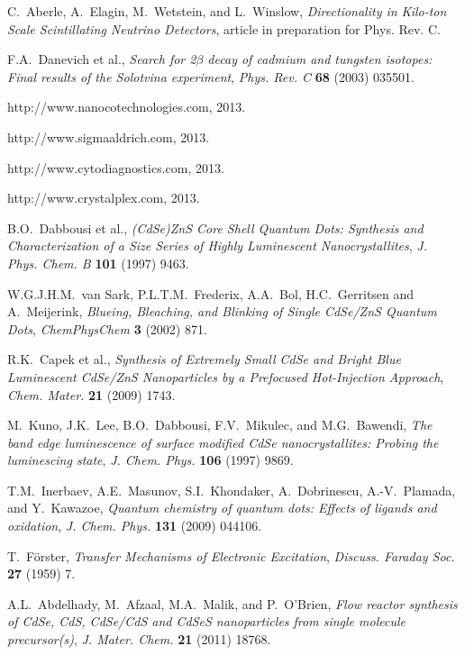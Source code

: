 \documentclass[cits]{JINST}
\begin{document}
\begin{thebibliography}{9}
C.~Aberle, A.~Elagin, M.~Wetstein, and L.~Winslow, \emph{Directionality in Kilo-ton Scale Scintillating Neutrino Detectors}, article in preparation for Phys. Rev. C. 
 
F.A.~Danevich et al., \emph{Search for 2$\beta$ decay of cadmium and tungsten isotopes: Final results of the Solotvina experiment}, \emph{Phys. Rev. C} {\bf 68} (2003) 035501.

http://www.nanocotechnologies.com, 2013. 

http://www.sigmaaldrich.com, 2013. 

http://www.cytodiagnostics.com, 2013.

http://www.crystalplex.com, 2013. 

B.O.~Dabbousi et al., \emph{(CdSe)ZnS Core Shell Quantum Dots: Synthesis and Characterization of a Size Series of Highly Luminescent Nanocrystallites}, \emph{J. Phys. Chem. B} {\bf 101} (1997) 9463.

W.G.J.H.M.~van Sark, P.L.T.M.~Frederix, A.A.~Bol, H.C.~Gerritsen and A.~Meijerink, \emph{Blueing, Bleaching, and Blinking of Single CdSe/ZnS Quantum Dots}, \emph{ChemPhysChem} {\bf 3} (2002) 871.

R.K.~Capek et al., \emph{Synthesis of Extremely Small CdSe and Bright Blue Luminescent CdSe/ZnS Nanoparticles by a Prefocused Hot-Injection Approach}, \emph{Chem. Mater.} {\bf 21} (2009) 1743.

M.~Kuno, J.K.~Lee, B.O.~Dabbousi, F.V.~Mikulec, and M.G.~Bawendi, \emph{The band edge luminescence of surface modified CdSe nanocrystallites: Probing the luminescing state}, \emph{J. Chem. Phys.} {\bf 106} (1997) 9869.

T.M.~Inerbaev, A.E.~Masunov, S.I.~Khondaker, A.~Dobrinescu, A.-V.~Plamada, and Y.~Kawazoe, \emph{Quantum chemistry of quantum dots: Effects of ligands and oxidation}, \emph{J. Chem. Phys.} {\bf 131} (2009) 044106. 

T.~F\"{o}rster, \emph{Transfer Mechanisms of Electronic Excitation}, \emph{Discuss. Faraday Soc.} {\bf 27} (1959) 7.

A.L.~Abdelhady, M.~Afzaal, M.A.~Malik, and P.~O'Brien, \emph{Flow reactor synthesis of CdSe, CdS, CdSe/CdS and CdSeS nanoparticles from single molecule precursor(s)}, \emph{J. Mater. Chem.} {\bf 21} (2011) 18768.


\end{thebibliography}
\end{document}
